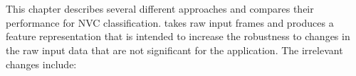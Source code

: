 \section{\FeatureGenerationTitle}
\label{SectionFeatureGeneration}

This chapter describes several different \featureGeneration approaches and compares their performance for \ac{NVC} classification.
\FeatureGeneration takes raw input frames and produces a feature representation that is intended to increase the robustness to changes in the raw input data that are not significant for the application.
The irrelevant changes include:

